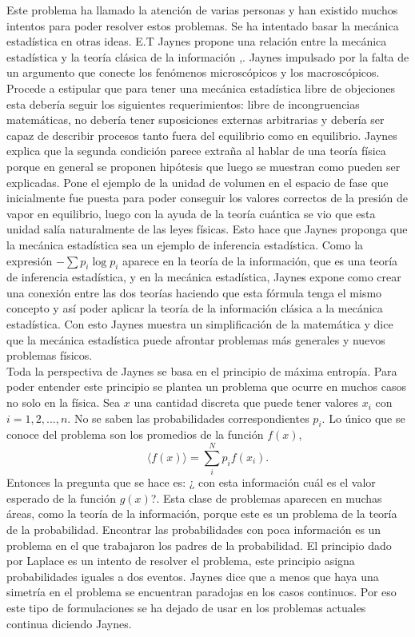 Este problema ha llamado la atención de varias personas y han existido muchos intentos para poder resolver estos problemas. Se ha intentado basar la mecánica estadística en otras ideas. E.T Jaynes propone una relación entre la mecánica estadística y la teoría clásica de la información \cite{JaynesI},\cite{JaynesII}. Jaynes impulsado por la falta de un argumento que conecte los fenómenos microscópicos y los macroscópicos. Procede a estipular que para tener una mecánica estadística libre de objeciones esta debería seguir los siguientes requerimientos: libre de incongruencias matemáticas, no debería tener suposiciones externas arbitrarias y debería ser capaz de describir procesos tanto fuera del equilibrio como en equilibrio. Jaynes explica que la segunda condición parece extraña al hablar de una teoría física porque en general se proponen hipótesis que luego se muestran como pueden ser explicadas. Pone el ejemplo de la unidad de volumen en el espacio de fase que inicialmente fue puesta para poder conseguir los valores correctos de la presión de vapor en equilibrio, luego con la ayuda de la teoría cuántica se vio que esta unidad salía naturalmente de las leyes físicas. Esto hace que Jaynes proponga que la mecánica estadística sea un ejemplo de inferencia estadística. Como la expresión $- \sum p_{i} \log p_{i}$ aparece en la teoría de la información, que es una teoría de inferencia estadística, y en la mecánica estadística, Jaynes expone como crear una conexión entre las dos teorías haciendo que esta fórmula tenga el mismo concepto y así poder aplicar la teoría de la información clásica a la mecánica estadística. Con esto Jaynes muestra un simplificación de la matemática y dice que la mecánica estadística puede afrontar problemas más generales y nuevos problemas físicos.
\\
Toda la perspectiva de Jaynes se basa en el principio de máxima entropía. Para poder entender este principio se plantea un problema que ocurre en muchos casos no solo en la física. Sea $x$ una cantidad discreta que puede tener valores $x_{i}$ con $i=1,2,...,n$. No se saben las probabilidades correspondientes $p_{i}$. Lo único que se  conoce del problema son los promedios de la función $f(x)$,
\begin{equation}
\langle f(x) \rangle =\sum_{i}^{N} p_{i} f(x_{i}).
\end{equation}
Entonces la pregunta que se hace es: ¿ con esta información cuál es el valor esperado de la función $g(x)$?. Esta clase de problemas aparecen en muchas áreas, como la teoría de la información, porque este es un problema de la teoría de la probabilidad. Encontrar las probabilidades con poca información es un problema en el que trabajaron los padres de la probabilidad. El principio dado por Laplace es un intento de resolver el problema, este principio asigna probabilidades iguales a dos eventos. Jaynes dice que a menos que haya una simetría en el problema se encuentran paradojas en los casos continuos. Por eso este tipo de formulaciones se ha dejado de usar en los problemas actuales continua diciendo Jaynes.
